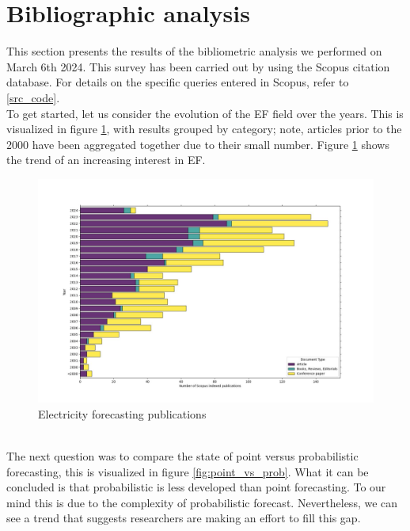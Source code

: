 \section{Bibliographic analysis}
This section presents the results of the bibliometric analysis we performed on March 6th 2024. This survey has been carried out by using the Scopus citation database. For details on the specific queries entered in Scopus, refer to \ref{src_code}.
\\
To get started, let us consider the evolution of the EF field over the years. This is visualized in figure \ref{fig:epf_evolution}, with results grouped by category; note, articles prior to the 2000 have been aggregated together due to their small number. Figure \ref{fig:epf_evolution} shows the trend of an increasing interest in EF.
\begin{figure}
    \includegraphics[width=\textwidth]{images/epf_evolution1.jpg}
    \caption{Electricity forecasting publications}
    \label{fig:epf_evolution}
  \end{figure}
\\
The next question was to compare the state of point versus probabilistic forecasting, this is visualized in figure \ref{fig:point_vs_prob}. What it can be concluded is that probabilistic is less developed than point forecasting. To our mind this is due to the complexity of probabilistic forecast.
Nevertheless, we can see a trend that suggests researchers are making an effort to fill this gap.
